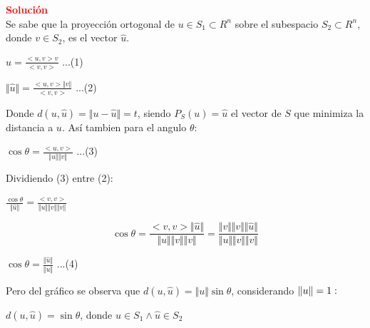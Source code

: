 \documentclass[12pt]{article}
\begin{document}
\noindent \textcolor{red}{\bf Solución}\\
Se sabe que la proyección ortogonal de $u \in S_{1} \subset R^n$ sobre el subespacio $S_{2}\subset R^n$, donde  $v\in S_{2}$,  es el vector $\widehat{u}$.\\
\begin{center}
$\widehat{u}=\frac{<u,v>v}{<v,v>}$ ...(1)
\end{center}
\begin{center}
$\Vert \widehat{u} \Vert=\frac{<u,v>\Vert v\Vert}{<v,v>}$ ...(2)
\end{center}
\begin{center}

\end{center}
Donde $d(u,\widehat{u}) = \Vert u - \widehat{u}\Vert = t$, siendo $P_{S}(u)=\widehat{u}$ el vector de $S$ que minimiza la distancia a $u$. Así tambien para el angulo $\theta$:\\
\begin{center}
$\cos{\theta}= \frac{<u,v>}{\Vert u\Vert \Vert v\Vert}$ ...(3)
\end{center}
Dividiendo (3) entre (2):\\
\begin{center}
$\frac{\cos{\theta}}{\Vert \widehat{u}\Vert} = \frac{<v,v>}{\Vert u\Vert \Vert v\Vert \Vert v\Vert} $
\end{center}
\begin{center}
$$\cos{\theta} = \frac{<v,v> \Vert \widehat{u}\Vert}{\Vert u\Vert \Vert v\Vert \Vert v\Vert} = \frac{ \Vert v\Vert \Vert v\Vert \Vert \widehat{u}\Vert}{\Vert u\Vert \Vert v\Vert \Vert v\Vert} $$
\end{center}
\begin{center}
$\cos{\theta} = \frac{\Vert \widehat{u}\Vert}{\Vert u\Vert} $ ...(4)
\end{center}
Pero del gráfico se observa que $d(u,\widehat{u})=\Vert u\Vert \sin{\theta}$, considerando $\Vert u\Vert=1:\\$
\begin{center}
$d(u,\widehat{u})=\sin{\theta}$, donde $u\in S_{1} \wedge \widehat{u}\in S_{2}$ 
\end{center}
\end{document}
